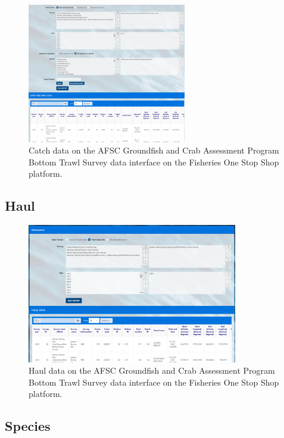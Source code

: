 \documentclass[
  letterpaper,
  oneside,
  open=any]{scrbook}
\begin{document}
\begin{figure}[H]

{\centering \includegraphics[width=2.73in,height=\textheight]{content/../img/foss_1_interface_catch.png}

}

\caption{Catch data on the AFSC Groundfish and Crab Assessment Program
Bottom Trawl Survey data interface on the Fisheries One Stop Shop
platform.}

\end{figure}%

\subsection{Haul}\label{haul}

\begin{figure}[H]

{\centering \includegraphics[width=3.61in,height=\textheight]{content/../img/foss_1_interface_haul.png}

}

\caption{Haul data on the AFSC Groundfish and Crab Assessment Program
Bottom Trawl Survey data interface on the Fisheries One Stop Shop
platform.}

\end{figure}%

\subsection{Species}\label{species}
\end{document}
